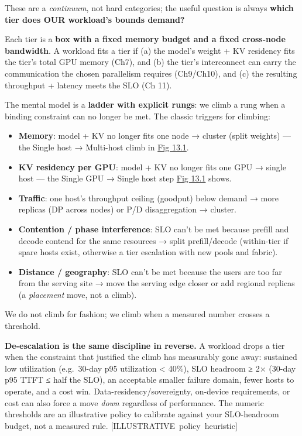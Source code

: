 These are a \emph{continuum}, not hard categories; the useful question
is always \textbf{which tier does OUR workload's bounds demand?}

\label{mental-model}


Each tier is a \textbf{box with a fixed memory budget and a fixed
cross-node bandwidth}. A workload fits a tier if (a) the model's weight
+ KV residency fits the tier's total GPU memory (Ch7), and (b) the
tier's interconnect can carry the communication the chosen parallelism
requires (Ch9/Ch10), and (c) the resulting throughput + latency meets
the SLO (Ch 11).

The mental model is a \textbf{ladder with explicit rungs}: we climb a
rung when a binding constraint can no longer be met. The classic
triggers for climbing:

\begin{itemize}
\tightlist
\item
  \textbf{Memory}: model + KV no longer fits one node → cluster (split
  weights) --- the Single host → Multi-host climb in \hyperref[fig:13.1]{Fig 13.1}.
\item
  \textbf{KV residency per GPU}: model + KV no longer fits one GPU →
  single host --- the Single GPU → Single host step \hyperref[fig:13.1]{Fig 13.1} shows.
\item
  \textbf{Traffic}: one host's throughput ceiling (goodput) below demand
  → more replicas (DP across nodes) or P/D disaggregation → cluster.
\item
  \textbf{Contention / phase interference}: SLO can't be met because
  prefill and decode contend for the same resources → split
  prefill/decode (within-tier if spare hosts exist, otherwise a tier
  escalation with new pools and fabric).
\item
  \textbf{Distance / geography}: SLO can't be met because the users are
  too far from the serving site → move the serving edge closer or add
  regional replicas (a \emph{placement} move, not a climb).
\end{itemize}

We do not climb for fashion; we climb when a measured number crosses a
threshold.

\textbf{De-escalation is the same discipline in reverse.} A workload
drops a tier when the constraint that justified the climb has measurably
gone away: sustained low utilization (e.g.~30-day p95 utilization
\textless{} 40\%), SLO headroom ≥ 2× (30-day p95 TTFT ≤ half the SLO),
an acceptable smaller failure domain, fewer hosts to operate, and a cost
win. Data-residency/sovereignty, on-device requirements, or cost can
also force a move \emph{down} regardless of performance. The numeric
thresholds are an illustrative policy to calibrate against your
SLO-headroom budget, not a measured rule. \mbox{{[}ILLUSTRATIVE policy
heuristic{]}}

